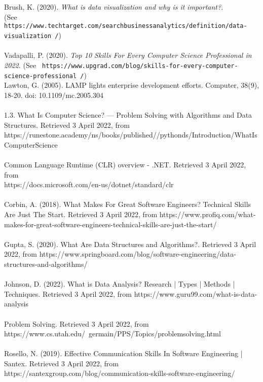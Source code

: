 \documentclass[a4paper, 11pt]{report}
\begin{document}
	\\
	\\
	Brush, K. (2020). \textit{ What is data visualization and why is it important?.} \\(See \texttt{ https://www.techtarget.com/searchbusinessanalytics/definition/data-visualization /})
	\\
	\\
	Vadapalli, P. (2020). \textit{ Top 10 Skills For Every Computer Science Professional in 2022.} (See \texttt{ https://www.upgrad.com/blog/skills-for-every-computer-science-professional /})
	\\
	Lawton, G. (2005). LAMP lights enterprise development efforts. Computer, 38(9), 18-20. doi: 10.1109/mc.2005.304
	\\
	\\
	1.3. What Is Computer Science? — Problem Solving with Algorithms and Data Structures. Retrieved 3 April 2022, from \\https://runestone.academy/ns/books/published//pythonds/Introduction/WhatIsComputerScience
	\\
	\\
	Common Language Runtime (CLR) overview - .NET. Retrieved 3 April 2022, from \\https://docs.microsoft.com/en-us/dotnet/standard/clr
	\\
	\\
	Corbin, A. (2018). What Makes For Great Software Engineers? Technical Skills Are Just The Start. Retrieved 3 April 2022, from https://www.profiq.com/what-makes-for-great-software-engineers-technical-skills-are-just-the-start/
	\\
	\\
	Gupta, S. (2020). What Are Data Structures and Algorithms?. Retrieved 3 April 2022, from https://www.springboard.com/blog/software-engineering/data-structures-and-algorithms/
	\\
	\\
	Johnson, D. (2022). What is Data Analysis? Research | Types | Methods | Techniques. Retrieved 3 April 2022, from https://www.guru99.com/what-is-data-analysis
	\\
	\\
	Problem Solving. Retrieved 3 April 2022, from 
	\\https://www.cs.utah.edu/~germain/PPS/Topics/problemsolving.html
	\\
	\\
	Rosello, N. (2019). Effective Communication Skills In Software Engineering | Santex. Retrieved 3 April 2022, from https://santexgroup.com/blog/communication-skills-software-engineering/
\end{document}
